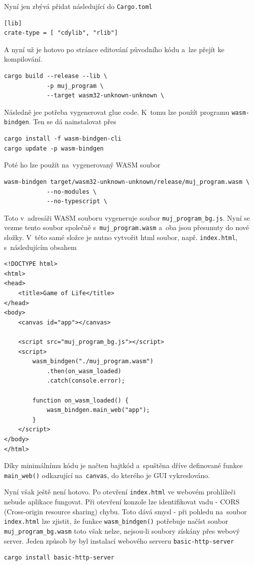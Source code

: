 \documentclass[a4paper, 12pt, twoside]{article} %
\newcommand{\rust}[1]{\texttt{#1}}
\begin{document}
		Nyní jen zbývá přidat následující do \texttt{Cargo.toml}
\begin{verbatim}
[lib]
crate-type = [ "cdylib", "rlib"]
		\end{verbatim}
		
		A nyní už je hotovo po stránce editování původního kódu a~lze přejít ke kompilování.
		\begin{verbatim}
cargo build --release --lib \
			-p muj_program \
			--target wasm32-unknown-unknown \
		\end{verbatim}
		
		Následně jee potřeba vygenerovat glue code. K~tomu lze použít programu \texttt{wasm-bindgen}. Ten se dá nainstalovat přes
		\begin{verbatim}
cargo install -f wasm-bindgen-cli
cargo update -p wasm-bindgen
		\end{verbatim}
		
		Poté ho lze použít na~vygenerovaný WASM soubor
		\begin{verbatim}
wasm-bindgen target/wasm32-unknown-unknown/release/muj_program.wasm \
			--no-modules \
			--no-typescript \
		\end{verbatim}
		
		Toto v~adresáři WASM souboru vygeneruje soubor \texttt{muj\_program\_bg.js}. Nyní se vezme tento soubor společně s~\texttt{muj\_program.wasm} a~oba jsou přesunuty do nové složky. V~této samé složce je nutno vytvořit html soubor, např. \texttt{index.html}, s~následujícím obsahem
		\begin{verbatim}
<!DOCTYPE html>
<html>
<head>
	<title>Game of Life</title>
</head>
<body>
	<canvas id="app"></canvas>

	<script src="muj_program_bg.js"></script>
	<script>
		wasm_bindgen("./muj_program.wasm")
			.then(on_wasm_loaded)
			.catch(console.error);

		function on_wasm_loaded() {
			wasm_bindgen.main_web("app");
		}
	</script>
</body>
</html>
		\end{verbatim}
		
		Díky minimálnímu kódu je načten bajtkód a~spuštěna dříve definované funkce \rust{main_web()} odkazující na~\texttt{canvas}, do kterého je GUI vykreslováno.
		
		Nyní však ještě není hotovo. Po otevření \texttt{index.html} ve webovém prohlížeči nebude aplikace fungovat. Při otevření konzole lze identifikovat vadu - CORS (Cross-origin resource sharing) chybu. Toto dává smysl - při pohledu na~soubor \texttt{index.html} lze zjistit, že funkce \rust{wasm_bindgen()} potřebuje načíst soubor \texttt{muj\_program\_bg.wasm} toto však nelze, nejsou-li soubory získány přes webový server. Jeden způsob by byl instalací webového serveru \texttt{basic-http-server}
		\begin{verbatim}
cargo install basic-http-server
		\end{verbatim}
		
\end{document}
